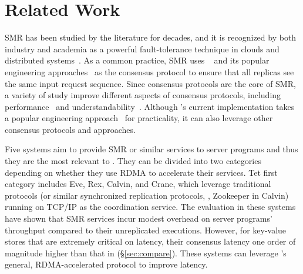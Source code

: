 \section{Related Work} \label{sec:related}


   SMR 
has been studied by the literature 
for decades, and it is recognized by both industry and academia as a powerful 
fault-tolerance technique in clouds and distributed 
systems~\cite{lamportclock,smr:tutorial}. As a common practice, SMR uses 
\paxos~\cite{paxos,paxos:simple,paxos:complex} and its popular engineering 
approaches~\cite{paxos:live,paxos:practical} as the consensus protocol to 
ensure that all replicas see the same input request sequence. Since consensus 
protocols are the core of SMR, a variety of study improve different aspects of 
consensus protocols, including performance~\cite{epaxos:sosp13,paxos:fast} and 
understandability~\cite{raft:usenix14}. Although \xxx's current implementation 
takes a popular engineering approach~\cite{paxos:practical} for practicality, 
it can also leverage other consensus protocols and approaches.

Five systems aim to provide SMR or similar services to server programs and 
thus they are the most relevant to \xxx. They can be divided into two 
categories depending on whether they use RDMA to accelerate their services. 
Tet first category includes Eve, Rex, Calvin, and Crane, which 
leverage traditional \paxos protocols (or similar synchronized replication 
protocols, \eg, Zookeeper in Calvin) running on TCP/IP as the coordination 
service. The evaluation in these systems have shown that SMR services incur 
modest overhead on server programs' throughput compared to their unreplicated 
executions. However, for key-value stores that are extremely critical on 
latency, their consensus latency one order of magnitude higher than that in 
\xxx (\S\ref{sec:compare}). These systems can leverage \xxx's general, 
RDMA-accelerated protocol to improve latency.


